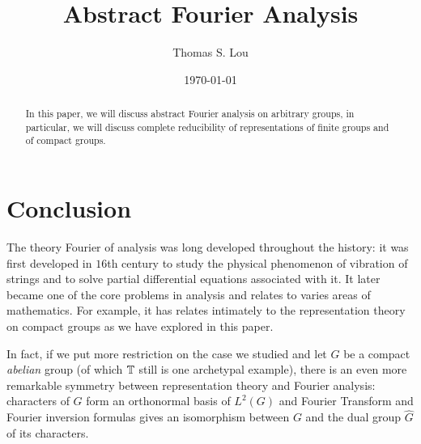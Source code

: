 \documentclass{amsart}
\begin{document}
\author{Thomas S. Lou}
\title{Abstract Fourier Analysis}
\address{University of Washington}
\date{\today}
\maketitle

\begin{abstract}
In this paper, we will discuss abstract Fourier analysis on arbitrary groups, in
particular, we will discuss complete reducibility of representations of finite
groups and of compact groups.
\end{abstract}

\tableofcontents

\newpage







% 

\section{Conclusion}

The theory Fourier of analysis was long developed throughout the history: it was
first developed in $16$th century to study the physical phenomenon of vibration
of strings and to solve partial differential equations associated with it.  It
later became one of the core problems in analysis and relates to varies areas of
mathematics.  For example, it has relates intimately to the representation
theory on compact groups as we have explored in this paper.

In fact, if we put more restriction on the case we studied and let $G$ be a
compact \emph{abelian} group (of which $\operatorname{\mathbb{T}}$ still is one archetypal example),
there is an even more remarkable symmetry between representation theory and
Fourier analysis: characters of $G$ form an orthonormal basis of $L^2(G)$ and
Fourier Transform and Fourier inversion formulas gives an isomorphism between
$G$ and the dual group $\hat{G}$ of its characters.






\newpage

\nocite{*}

\end{document}
